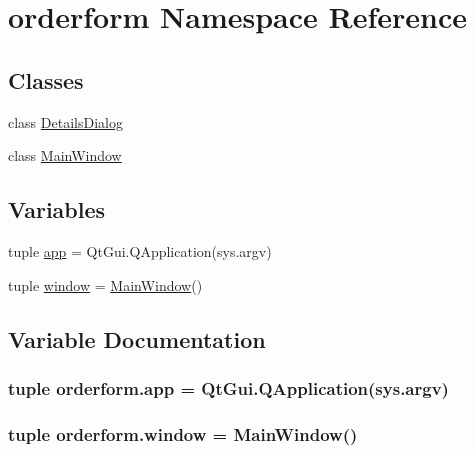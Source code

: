 \hypertarget{namespaceorderform}{}\section{orderform Namespace Reference}
\label{namespaceorderform}
\subsection*{Classes}
\begin{DoxyCompactItemize}
\item 
class \hyperlink{classorderform_1_1DetailsDialog}{Details\+Dialog}
\item 
class \hyperlink{classorderform_1_1MainWindow}{Main\+Window}
\end{DoxyCompactItemize}
\subsection*{Variables}
\begin{DoxyCompactItemize}
\item 
tuple \hyperlink{namespaceorderform_ad213edff9b41515de4c15a20e4fbb5a7}{app} = Qt\+Gui.\+Q\+Application(sys.\+argv)
\item 
tuple \hyperlink{namespaceorderform_a0917614d6a3352ce1b38ce5d907f6140}{window} = \hyperlink{classorderform_1_1MainWindow}{Main\+Window}()
\end{DoxyCompactItemize}


\subsection{Variable Documentation}
\hypertarget{namespaceorderform_ad213edff9b41515de4c15a20e4fbb5a7}{}
\subsubsection[{app}]{\setlength{\rightskip}{0pt plus 5cm}tuple orderform.\+app = Qt\+Gui.\+Q\+Application(sys.\+argv)}\label{namespaceorderform_ad213edff9b41515de4c15a20e4fbb5a7}
\hypertarget{namespaceorderform_a0917614d6a3352ce1b38ce5d907f6140}{}
\subsubsection[{window}]{\setlength{\rightskip}{0pt plus 5cm}tuple orderform.\+window = {\bf Main\+Window}()}\label{namespaceorderform_a0917614d6a3352ce1b38ce5d907f6140}
